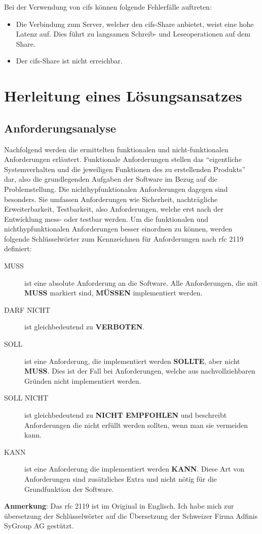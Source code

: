 \documentclass[titlepage]{report}
\begin{document}
Bei der Verwendung von \gls{cifs} können folgende Fehlerfälle auftreten:
\begin{itemize}
    \item Die Verbindung zum Server, welcher den \gls{cifs}\hyp{}Share
          anbietet, weist eine hohe Latenz auf. Dies führt zu langsamen
          Schreib\hyp{} und Leseoperationen auf dem Share.
    \item Der \gls{cifs}\hyp{}Share ist nicht erreichbar.
\end{itemize}
\chapter{Herleitung eines Lösungsansatzes}
\section{Anforderungsanalyse}
Nachfolgend werden die ermittelten funktionalen und nicht\hyp{}funktionalen
Anforderungen erläutert. Funktionale Anforderungen stellen das
``eigentliche Systemverhalten und die jeweiligen Funktionen des zu
erstellenden Produkts''\cite[S. 20]{BPSE} dar, also die grundlegenden
Aufgaben der Software im Bezug auf die Problemstellung. Die
nichthyp{}funktionalen Anforderungen dagegen sind besonders. Sie umfassen
Anforderungen wie Sicherheit, nachträgliche Erweiterbarkeit,
Testbarkeit, also Anforderungen, welche erst nach der Entwicklung
mess\hyp{} oder testbar werden\cite[S. 292]{SNFA}. Um die funktionalen
und nichthyp{}funktionalen Anforderungen besser einordnen zu können, werden
folgende Schlüsselwörter zum Kennzeichnen für Anforderungen nach
\gls{rfc} 2119\cite{RFC2119} definiert:
\begin{description}
    \item[MUSS] ist eine absolute Anforderung an die Software. Alle
        Anforderungen, die mit \textbf{MUSS} markiert sind,
        \textbf{MÜSSEN} implementiert werden.
    \item[DARF NICHT] ist gleichbedeutend zu \textbf{VERBOTEN}.
    \item[SOLL] ist eine Anforderung, die implementiert werden
        \textbf{SOLLTE}, aber nicht \textbf{MUSS}. Dies ist der Fall bei
        Anforderungen, welche aus nachvollziehbaren Gründen nicht
        implementiert werden.
    \item[SOLL NICHT] ist gleichbedeutend zu \textbf{NICHT EMPFOHLEN}
        und beschreibt Anforderungen die nicht erfüllt werden sollten,
        wenn man sie vermeiden kann.
    \item[KANN] ist eine Anforderung die implementiert werden
        \textbf{KANN}. Diese Art von Anforderungen sind
        zusätzliches Extra und nicht nötig für die Grundfunktion der
        Software.
\end{description}
\textbf{Anmerkung}: Das \gls{rfc} 2119 ist im Original in Englisch. Ich
habe mich zur übersetzung der Schlüsselwörter auf die Übersetzung der
Schweizer Firma Adfinis SyGroup AG gestützt\cite{RFC2119DE}.
\end{document}
